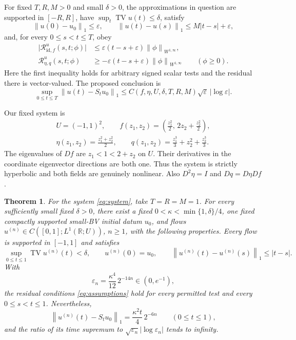 \documentclass[11pt]{article}
\newtheorem{theorem}{Theorem}[section]
\newcommand{\R}{\mathbb R}
\newcommand{\TV}{\operatorname{TV}}
\newcommand{\Res}{\mathcal R}
\newcommand{\norm}[1]{\left\|#1\right\|}
\begin{document}
For fixed $T,R,M>0$ and small $\delta>0$, the approximations in question are supported in $[-R,R]$, have $\sup_t\TV u(t)\le\delta$, satisfy
\[
 \norm{u(0)-u_0}_1\le\varepsilon,\qquad
 \norm{u(t)-u(s)}_1\le M|t-s|+\varepsilon,
\]
and, for every $0\le s<t\le T$, obey
\begin{equation}\label{eq:assumptions}
\begin{split}
 \bigl|\Res^u_{\mathrm{id},f}(s,t;\phi)\bigr|
 &\le\varepsilon(t-s+\varepsilon)\norm{\phi}_{W^{1,\infty}},\\
 \Res^u_{\eta,q}(s,t;\phi)
 &\ge-\varepsilon(t-s+\varepsilon)\norm{\phi}_{W^{1,\infty}}
 \qquad(\phi\ge0).
\end{split}
\end{equation}
Here the first inequality holds for arbitrary signed scalar tests and the residual there is vector-valued. The proposed conclusion is
\begin{equation}\label{eq:proposed}
 \sup_{0\le t\le T}\norm{u(t)-S_tu_0}_1
 \le C(f,\eta,U,\delta,T,R,M)\sqrt\varepsilon\,|\log\varepsilon|.
\end{equation}

Our fixed system is
\begin{equation}\label{eq:system}
\begin{gathered}
 U=(-1,1)^2,\qquad
 f(z_1,z_2)=\left(\frac{z_1^2}{2},\,2z_2+\frac{z_2^2}{2}\right),\\
 \eta(z_1,z_2)=\frac{z_1^2+z_2^2}{2},\qquad
 q(z_1,z_2)=\frac{z_1^3}{3}+z_2^2+\frac{z_2^3}{3}.
\end{gathered}
\end{equation}
The eigenvalues of $Df$ are $z_1<1<2+z_2$ on $U$. Their derivatives in the coordinate eigenvector directions are both one. Thus the system is strictly hyperbolic and both fields are genuinely nonlinear. Also $D^2\eta=I$ and $Dq=D\eta Df$.

\begin{theorem}\label{thm:main}
For the system \eqref{eq:system}, take $T=R=M=1$. For every sufficiently small fixed $\delta>0$, there exist a fixed $0<\kappa<\min\{1,\delta\}/4$, one fixed compactly supported small-BV initial datum $u_0$, and flows $u^{(n)}\in C([0,1];L^1(\R;U))$, $n\ge1$, with the following properties. Every flow is supported in $[-1,1]$ and satisfies
\[
 \sup_{0\le t\le1}\TV u^{(n)}(t)<\delta,\qquad
 u^{(n)}(0)=u_0,\qquad
 \norm{u^{(n)}(t)-u^{(n)}(s)}_1\le|t-s|.
\]
With
\begin{equation}\label{eq:epsilon}
 \varepsilon_n=\frac{\kappa^4}{12}\,2^{-14n}\in(0,e^{-1}),
\end{equation}
the residual conditions \eqref{eq:assumptions} hold for every permitted test and every $0\le s<t\le1$. Nevertheless,
\begin{equation}\label{eq:error}
 \norm{u^{(n)}(t)-S_tu_0}_1
 =\frac{\kappa^2t}{4}\,2^{-6n}\qquad(0\le t\le1),
\end{equation}
and the ratio of its time supremum to $\sqrt{\varepsilon_n}|\log\varepsilon_n|$ tends to infinity.
\end{theorem}
\end{document}
